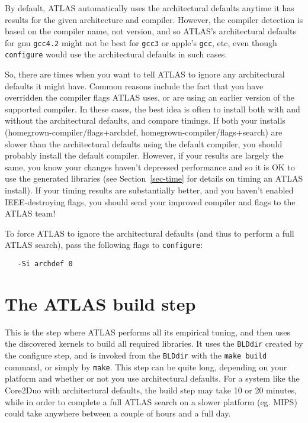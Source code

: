 \documentclass[11pt]{article}
\begin{document}
By default, ATLAS automatically uses the architectural defaults anytime
it has results for the given architecture and compiler.  However, the
compiler detection is based on the compiler name, not version, and so
ATLAS's architectural defaults for gnu {\tt gcc4.2} might not be best
for {\tt gcc3} or apple's {\tt gcc}, etc, even though {\tt configure} would
use the architectural defaults in such cases.

So, there are times when you want to tell ATLAS to ignore any architectural
defaults it might have.  Common reasons include the fact that you have
overridden the compiler flags ATLAS uses, or are using an earlier version
of the supported compiler.  In these cases, the best idea is often to
install both with and without the architectural defaults, and compare timings.
If both your installs (homegrown-compiler/flags+archdef, 
homegrown-compiler/flags+search) are slower than the architectural defaults
using the default compiler, you should probably install the default 
compiler.  However, if your results are largely the same, you know your
changes haven't depressed performance and so it is OK to use the generated
libraries (see Section~\ref{sec-time} for details on timing an ATLAS
install).  If your timing results are substantially better, and you haven't
enabled IEEE-destroying flags, you should send your improved compiler and
flags to the ATLAS team!

To force ATLAS to ignore the architectural defaults (and thus to perform
a full ATLAS search), pass the following flags to {\tt configure}:
\begin{verbatim}
   -Si archdef 0
\end{verbatim}

\section{The ATLAS build step}
\label{sec-build}

This is the step where ATLAS performs all its empirical tuning, and then
uses the discovered kernels to build all required libraries.  It uses
the {\tt BLDdir} created by the configure step, and is invoked from
the {\tt BLDdir} with the {\tt make build} command, or simply by {\tt make}.
This step can be quite long, depending on your platform and whether or
not you use architectural defaults.  For a system like the Core2Duo with
architectural defaults, the build step may take 10 or 20 minutes, while in
order to complete a full ATLAS search on a slower platform (eg. MIPS) could
take anywhere between a couple of hours and a full day.
\end{document}
